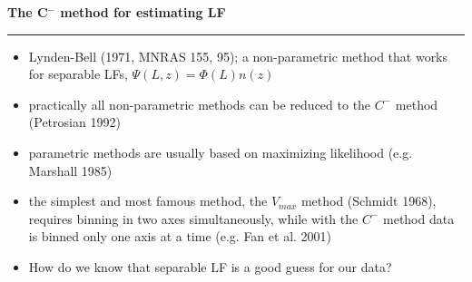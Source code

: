 \documentclass[letterpaper,landscape]{slides}
\begin{document}
\begin{slide}
\begin{center}
\bfseries
{\large {\color{red} The C$^-$ method for estimating LF}}
\end{center}
\vskip 0.2in
\hrule

\begin{itemize}
\item Lynden-Bell (1971, MNRAS 155, 95); a non-parametric method that works 
for separable LFs, $\Psi(L,z) = \Phi(L) n(z)$
\item practically all non-parametric methods can be reduced to the $C^-$
      method (Petrosian 1992)
\item parametric methods are usually based on maximizing likelihood
      (e.g. Marshall 1985)
\item the simplest and most famous method, the $V_{max}$ method (Schmidt 1968),
      requires binning in two axes simultaneously, while with the $C^-$
      method data is binned only one axis at a time (e.g. Fan et al. 2001) 
\item How do we know that separable LF is a good guess for our data?
\end{itemize}

\vfill
\end{slide}
 
\end{document}
